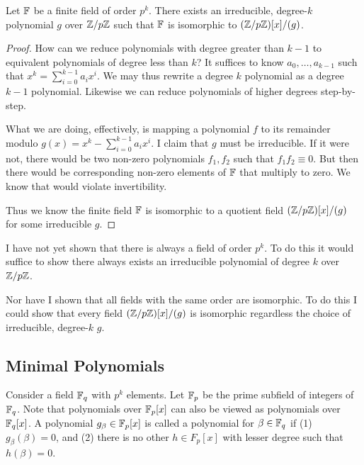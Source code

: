\begin{lemma}
  Let $\mathbb{F}$ be a finite field of order $p^k$. There exists an
  irreducible, degree-$k$ polynomial $g$ over $\mathbb{Z} / p\mathbb{Z}$ such that $\mathbb{F}$ is
  isomorphic to $\mathopen{}\left( {\mathbb{Z} / p\mathbb{Z}} \right)\mathclose{}[x]/(g)$.
\end{lemma}

\begin{proof}
  How can we reduce polynomials with degree greater than $k-1$ to
  equivalent polynomials of degree less than $k$? It suffices to know
  $a_0, \ldots, a_{k-1}$ such that $x^k = \sum_{i=0}^{k-1} a_i x^i$. We
  may thus rewrite a degree $k$ polynomial as a degree $k-1$ polynomial.
  Likewise we can reduce polynomials of higher degrees step-by-step.

  What we are doing, effectively, is mapping a polynomial $f$ to its
  remainder modulo $g(x) = x^k - \sum_{i=0}^{k-1} a_i x^i$. I claim that
  $g$ must be irreducible. If it were not, there would be two non-zero
  polynomials $f_1, f_2$ such that $f_1 f_2 \equiv 0$. But then there
  would be corresponding non-zero elements of $\mathbb{F}$ that multiply to
  zero. We know that would violate invertibility.

  Thus we know the finite field $\mathbb{F}$ is isomorphic to a quotient field
  $\mathopen{}\left( {\mathbb{Z} / p\mathbb{Z}} \right)\mathclose{}[x]/(g)$ for some irreducible $g$.
\end{proof}

\begin{remark}
  I have not yet shown that there is always a field of order $p^k$. To
  do this it would suffice to show there always exists an irreducible
  polynomial of degree $k$ over $\mathbb{Z} / p\mathbb{Z}$.

  Nor have I shown that all fields with the same order are isomorphic.
  To do this I could show that every field $\mathopen{}\left( {\mathbb{Z} / p\mathbb{Z}} \right)\mathclose{}[x]/(g)$ is
  isomorphic regardless the choice of irreducible, degree-$k$ $g$.
\end{remark}

\subsection{Minimal Polynomials}

\newcommand{\Fmodg}{\parens{\Zmodp}[x]/(g)}

\begin{definition}
  Consider a field $\mathbb{F}_q$ with $p^k$ elements. Let $\mathbb{F}_p$ be the prime
  subfield of integers of $\mathbb{F}_q$. Note that polynomials over $\mathbb{F}_p[x]$
  can also be viewed as polynomials over $\mathbb{F}_q[x]$. A polynomial
  $g_\beta \in \mathbb{F}_p[x]$ is called a  polynomial for
  $\beta \in \mathbb{F}_q$ if (1) $g_\beta(\beta) = 0$, and (2) there is no
  other $h \in F_p[x]$ with lesser degree such that $h(\beta) = 0$.
\end{definition}

